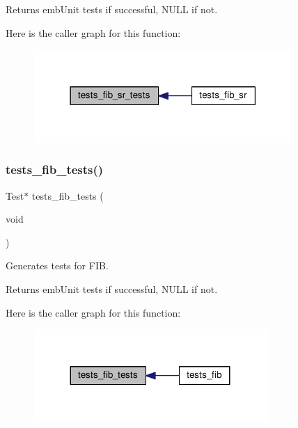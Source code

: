 \begin{DoxyReturn}{Returns}
emb\+Unit tests if successful, N\+U\+LL if not. 
\end{DoxyReturn}
Here is the caller graph for this function\+:
\nopagebreak
\begin{figure}[H]
\begin{center}
\leavevmode
\includegraphics[width=279pt]{group__unittests_ga61dfd0327d9f733fa863525f836b9c33_icgraph}
\end{center}
\end{figure}
\mbox{\label{group__unittests_gab8c38a5edf2b7ff93e1282d7c1cdb0ef}} 
\subsubsection{\texorpdfstring{tests\+\_\+fib\+\_\+tests()}{tests\_fib\_tests()}}
{\footnotesize\ttfamily Test$\ast$ tests\+\_\+fib\+\_\+tests (\begin{DoxyParamCaption}\item[{void}]{ }\end{DoxyParamCaption})}



Generates tests for F\+IB. 

\begin{DoxyReturn}{Returns}
emb\+Unit tests if successful, N\+U\+LL if not. 
\end{DoxyReturn}
Here is the caller graph for this function\+:
\nopagebreak
\begin{figure}[H]
\begin{center}
\leavevmode
\includegraphics[width=251pt]{group__unittests_gab8c38a5edf2b7ff93e1282d7c1cdb0ef_icgraph}
\end{center}
\end{figure}
\mbox{\label{group__unittests_ga4e4d5da67e11b5dccfc097568ed36d82}} 
